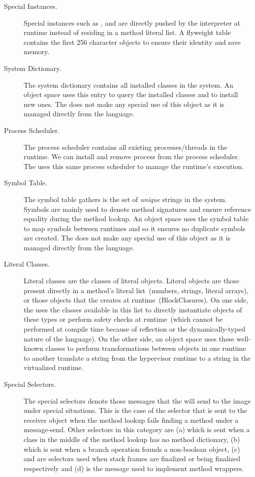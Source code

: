 \begin{description}
\item[Special Instances.] Special instances such as ,  and  are directly pushed by the \VM interpreter at runtime instead of residing in a method literal list. A flyweight  table contains the first 256 character objects to ensure their identity and save memory.

\item[System Dictionary.] The system dictionary contains all installed classes in the system. An object space uses this entry to query the installed classes and to install new ones. The \VM does not make any special use of this object as it is managed directly from the language.

\item[Process Scheduler.] The process scheduler contains all existing processes/threads in the runtime. We can install and remove process from the process scheduler. The \VM uses this same process scheduler to manage the runtime's execution.

\item[Symbol Table.] The symbol table gathers is the set of \emph{unique} strings in the system. Symbols are mainly used to denote method signatures and ensure reference equality during the method lookup. An object space uses the symbol table to map symbols between runtimes and so it ensures no duplicate symbols are created. The \VM does not make any special use of this object as it is managed directly from the language.

\item[Literal Classes.] Literal classes are the classes of literal objects. Literal objects are those present directly in a method's literal list~(\eg numbers, strings, literal arrays), or those objects that the \VM creates at runtime~(\eg BlockClosures). On one side, the \VM uses the classes available in this list to directly instantiate objects of these types or perform safety checks at runtime~(which cannot be performed at compile time because of reflection or the dynamically-typed nature of the language). On the other side, an object space uses these well-known classes to perform transformations between objects in one runtime to another \eg translate a string from the hypervisor runtime to a string in the virtualized runtime.

\item[Special Selectors.] The special selectors denote those messages that the \VM will send to the image under special situations. This is the case of the  selector that is sent to the receiver object when the method lookup fails finding a method under a message-send. Other selectors in this category are (a)  which is sent when a class in the middle of the method lookup has no method dictionary, (b)  which is sent when a branch operation founds a non-boolean object, (c)  and  are selectors used when stack frames are finalized or being finalized respectively and (d)  is the message used to implement method wrappers.

\end{description}
